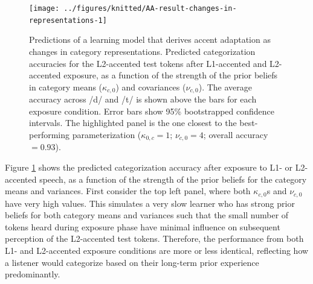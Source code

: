\documentclass[
  11pt,
  man,floatsintext]{apa6}
\begin{document}
\begin{figure}

{\centering \texttt{[image: ../figures/knitted/AA-result-changes-in-representations-1]} 

}

\caption{Predictions of a learning model that derives accent adaptation as changes in category representations. Predicted categorization accuracies for the L2-accented test tokens after L1-accented and L2-accented exposure, as a function of the strength of the prior beliefs in category means (\(\kappa_{c,0}\)) and covariances (\(\nu_{c,0}\)). The average accuracy across /d/ and /t/ is shown above the bars for each exposure condition. Error bars show 95\% bootstrapped confidence intervals. The highlighted panel is the one closest to the best-performing parameterization (\(\kappa_{0,c} = 1\); \(\nu_{c,0}=4\); overall accuracy \(=0.93\)).}\label{fig:AA-result-changes-in-representations}
\end{figure}

Figure \ref{fig:AA-result-changes-in-representations} shows the predicted categorization accuracy after exposure to L1- or L2-accented speech, as a function of the strength of the prior beliefs for the category means and variances. First consider the top left panel, where both \(\kappa_{c,0}\)s and \(\nu_{c,0}\) have very high values. This simulates a very slow learner who has strong prior beliefs for both category means and variances such that the small number of tokens heard during exposure phase have minimal influence on subsequent perception of the L2-accented test tokens. Therefore, the performance from both L1- and L2-accented exposure conditions are more or less identical, reflecting how a listener would categorize based on their long-term prior experience predominantly.
\end{document}

